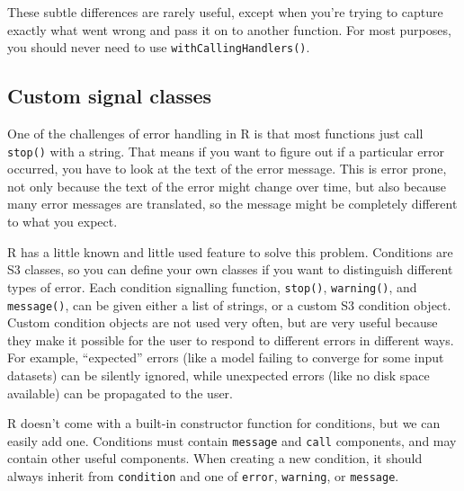These subtle differences are rarely useful, except when you're trying to
capture exactly what went wrong and pass it on to another function. For
most purposes, you should never need to use
\texttt{withCallingHandlers()}.

\subsection{Custom signal classes}

One of the challenges of error handling in R is that most functions just
call \texttt{stop()} with a string. That means if you want to figure out
if a particular error occurred, you have to look at the text of the
error message. This is error prone, not only because the text of the
error might change over time, but also because many error messages are
translated, so the message might be completely different to what you
expect. 

R has a little known and little used feature to solve this problem.
Conditions are S3 classes, so you can define your own classes if you
want to distinguish different types of error. Each condition signalling
function, \texttt{stop()}, \texttt{warning()}, and \texttt{message()},
can be given either a list of strings, or a custom S3 condition object.
Custom condition objects are not used very often, but are very useful
because they make it possible for the user to respond to different
errors in different ways. For example, ``expected'' errors (like a model
failing to converge for some input datasets) can be silently ignored,
while unexpected errors (like no disk space available) can be propagated
to the user.

R doesn't come with a built-in constructor function for conditions, but
we can easily add one. Conditions must contain \texttt{message} and
\texttt{call} components, and may contain other useful components. When
creating a new condition, it should always inherit from
\texttt{condition} and one of \texttt{error}, \texttt{warning}, or
\texttt{message}.

\begin{Shaded}
\begin{Highlighting}[]
\StringTok{ } \NormalTok{(-}
  \NormalTok{(}
     \NormalTok{),}
    \NormalTok{(}  
  \NormalTok{)}
\NormalTok{\}}
\StringTok{ }\NormalTok{)}
\end{Highlighting}
\end{Shaded}

